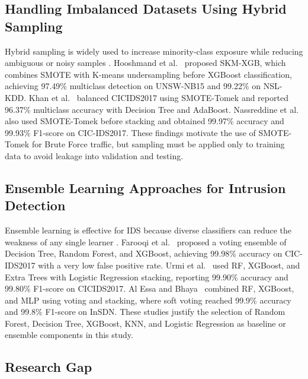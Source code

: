 \documentclass[conference,a4paper]{IEEEtran}
\begin{document}
\subsection{Handling Imbalanced Datasets Using Hybrid Sampling}

Hybrid sampling is widely used to increase minority-class exposure while reducing ambiguous or noisy samples \cite{harini2023minority,yang2024imbalanced,prasad2025optimizing}. Hooshmand et al.\ \cite{hooshmand2024robust} proposed SKM-XGB, which combines SMOTE with K-means undersampling before XGBoost classification, achieving 97.49\% multiclass detection on UNSW-NB15 and 99.22\% on NSL-KDD. Khan et al.\ \cite{khan2024balanced} balanced CICIDS2017 using SMOTE-Tomek and reported 96.37\% multiclass accuracy with Decision Tree and AdaBoost. Nassreddine et al.\ \cite{nassreddine2025ensemble} also used SMOTE-Tomek before stacking and obtained 99.97\% accuracy and 99.93\% F1-score on CIC-IDS2017. These findings motivate the use of SMOTE-Tomek for Brute Force traffic, but sampling must be applied only to training data to avoid leakage into validation and testing.

\subsection{Ensemble Learning Approaches for Intrusion Detection}

Ensemble learning is effective for IDS because diverse classifiers can reduce the weakness of any single learner \cite{emanet2023voting,pramanick2025stacking,wardana2024collaborative,gu2025semisupervised,alsubaei2025smart}. Farooqi et al.\ \cite{farooqi2024enhancing} proposed a voting ensemble of Decision Tree, Random Forest, and XGBoost, achieving 99.98\% accuracy on CIC-IDS2017 with a very low false positive rate. Urmi et al.\ \cite{urmi2024stacked} used RF, XGBoost, and Extra Trees with Logistic Regression stacking, reporting 99.90\% accuracy and 99.80\% F1-score on CICIDS2017. Al Essa and Bhaya\ \cite{alessa2024hybrid} combined RF, XGBoost, and MLP using voting and stacking, where soft voting reached 99.9\% accuracy and 99.8\% F1-score on InSDN. These studies justify the selection of Random Forest, Decision Tree, XGBoost, KNN, and Logistic Regression as baseline or ensemble components in this study.

\subsection{Research Gap}
\end{document}
